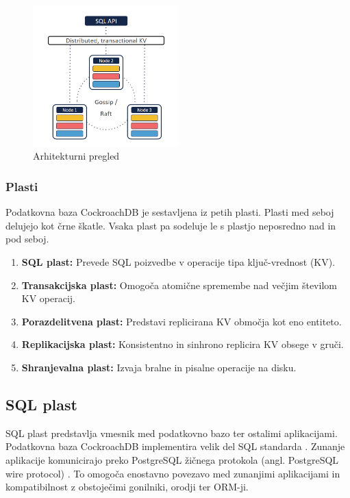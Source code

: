 \documentclass[a4paper, 12pt]{book}
\begin{document}
\begin{figure}[H]
\begin{center}
\includegraphics[width=0.5\textwidth]{resources/crdb-arhitecture-overview.png}
\end{center}
\caption{Arhitekturni pregled \cite{CRDB-2017}}
\label{img_crdb_arhitecture_overview}
\end{figure}

\subsubsection{Plasti}
Podatkovna baza CockroachDB je sestavljena iz petih plasti. Plasti med seboj delujejo kot črne škatle. Vsaka plast pa sodeluje le s plastjo neposredno nad in pod seboj.

\begin{enumerate}
    \item \textbf{SQL plast:} Prevede SQL poizvedbe v operacije tipa ključ-vrednost (KV).
    \item \textbf{Transakcijska plast:} Omogoča atomične spremembe nad večjim šte\-vi\-lom KV operacij.
    \item \textbf{Porazdelitvena plast:} Predstavi replicirana KV območja kot eno entiteto.
    \item \textbf{Replikacijska plast:} Konsistentno in sinhrono replicira KV obsege v gruči.
    \item \textbf{Shranjevalna plast:} Izvaja bralne in pisalne operacije na disku.
\end{enumerate}

\subsection{SQL plast}

SQL plast predstavlja vmesnik med podatkovno bazo ter ostalimi aplikacijami.  Podatkovna baza CockroachDB implementira velik del SQL standarda \cite{CRDB-sql-standard}. Zunanje aplikacije komunicirajo preko PostgreSQL žičnega protokola (angl. PostgreSQL wire protocol) \cite{psql-wire-protocol}. To omogoča enostavno povezavo med zunanjimi aplikacijami in kompatibilnost z obstoječimi gonilniki, orodji ter ORM-ji.
\end{document}
